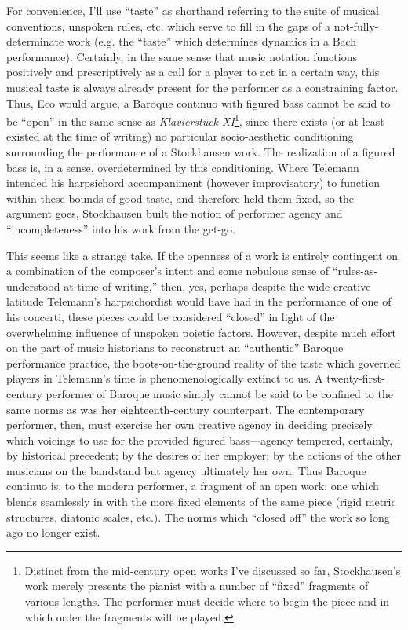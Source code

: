     For convenience, I'll use ``taste'' as shorthand referring to the suite of musical conventions, unspoken rules, etc. which serve to fill in the gaps of a not-fully-determinate work (e.g. the ``taste'' which determines dynamics in a Bach performance). Certainly, in the same sense that music notation functions positively and prescriptively as a call for a player to act in a certain way, this musical taste is always already present for the performer as a constraining factor. Thus, Eco would argue, a Baroque continuo with figured bass cannot be said to be ``open'' in the same sense as \textit{Klavierstück XI}\footnote{Distinct from the mid-century open works I've discussed so far, Stockhausen's work merely presents the pianist with a number of ``fixed'' fragments of various lengths. The performer must decide where to begin the piece and in which order the fragments will be played.}, since there exists (or at least existed at the time of writing) no particular socio-aesthetic conditioning surrounding the performance of a Stockhausen work. The realization of a figured bass is, in a sense, overdetermined by this conditioning. Where Telemann intended his harpsichord accompaniment (however improvisatory) to function within these bounds of good taste, and therefore held them fixed, so the argument goes, Stockhausen built the notion of performer agency and ``incompleteness'' into his work from the get-go.

    This seems like a strange take. If the openness of a work is entirely contingent on a combination of the composer's intent and some nebulous sense of ``rules-as-understood-at-time-of-writing,'' then, yes, perhaps despite the wide creative latitude Telemann's harpsichordist would have had in the performance of one of his concerti, these pieces could be considered ``closed'' in light of the overwhelming influence of unspoken poietic factors. However, despite much effort on the part of music historians to reconstruct an ``authentic'' Baroque performance practice, the boots-on-the-ground reality of the taste which governed players in Telemann's time is phenomenologically extinct to us. A twenty-first-century performer of Baroque music simply cannot be said to be confined to the same norms as was her eighteenth-century counterpart. The contemporary performer, then, must exercise her own creative agency in deciding precisely which voicings to use for the provided figured bass---agency tempered, certainly, by historical precedent; by the desires of her employer; by the actions of the other musicians on the bandstand but agency ultimately her own. Thus Baroque continuo is, to the modern performer, a fragment of an open work: one which blends seamlessly in with the more fixed elements of the same piece (rigid metric structures, diatonic scales, etc.). The norms which ``closed off'' the work so long ago no longer exist.


